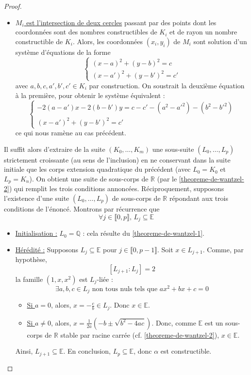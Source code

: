 \begin{proof}
\begin{itemize}
\begin{itemize}
      \end{itemize}
      \item \uline{$M_i$ est l'intersection de deux cercles} passant par des points dont les coordonnées sont des nombres constructibles de $K_i$ et de rayon un nombre constructible de $K_i$. Alors, les coordonnées $(x_i, y_i)$ de $M_i$ sont solution d'un système d'équations de la forme
      \[
      \begin{cases}
        (x-a)^2 + (y-b)^2 = c \\
        (x-a')^2 + (y-b')^2 = c'
      \end{cases}
      \]
      avec $a, b, c, a', b', c' \in K_i$ par construction. On soustrait la deuxième équation à la première, pour obtenir le système équivalent :
      \[
        \begin{cases}
          -2(a-a')x -2(b-b')y = c-c' - (a^2-a'^2) - (b^2-b'^2) \\
          (x-a')^2 + (y-b')^2 = c'
        \end{cases}
      \]
      ce qui nous ramène au cas précédent.
    \end{itemize}
    Il suffit alors d'extraire de la suite $(K_0, \dots, K_m)$ une sous-suite $(L_0, \dots, L_p)$ strictement croissante (au sens de l'inclusion) en ne conservant dans la suite initiale que les corps extension quadratique du précédent (avec $L_0 = K_0$ et $L_p = K_n$). On obtient une suite de sous-corps de $\mathbb{R}$ (par le \cref{theoreme-de-wantzel-2}) qui remplit les trois conditions annoncées.
    \newpar
    Réciproquement, supposons l'existence d'une suite $(L_0, \dots, L_p)$ de sous-corps de $\mathbb{R}$ répondant aux trois conditions de l'énoncé. Montrons par récurrence que
    \[ \forall j \in \llbracket 0, p \rrbracket, \, L_j \subseteq \mathbb{E} \]
    \begin{itemize}
      \item \uline{Initialisation :} $L_0 = \mathbb{Q}$ : cela résulte du \cref{theoreme-de-wantzel-1}.
      \item \uline{Hérédité :} Supposons $L_j \subseteq \mathbb{E}$ pour $j \in \llbracket 0, p-1 \rrbracket$. Soit $x \in L_{j+1}$. Comme, par hypothèse,
      \[ [L_{j+1}:L_j] = 2 \]
      la famille $(1,x,x^2)$ est $L_j$-liée :
      \[ \exists a, b, c \in L_j \text{ non tous nuls tels que } ax^2 + bx + c = 0 \]
      \begin{itemize}
        \item \uline{Si $a = 0$}, alors, $x = -\frac{c}{b} \in L_j$. Donc $x \in \mathbb{E}$.
        \item \uline{Si $a \neq 0$}, alors, $x = \frac{1}{2a}(-b \pm \sqrt{b^2 - 4ac})$. Donc, comme $\mathbb{E}$ est un sous-corps de $\mathbb{R}$ stable par racine carrée (cf. \cref{theoreme-de-wantzel-2}), $x \in \mathbb{E}$.
      \end{itemize}
      Ainsi, $L_{j+1} \subseteq \mathbb{E}$. En conclusion, $L_p \subseteq \mathbb{E}$, donc $\alpha$ est constructible.
    \end{itemize}
  \end{proof}

